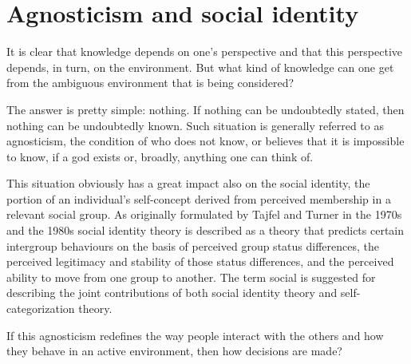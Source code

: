 \section{Agnosticism and social identity}
It is clear that knowledge depends on one’s perspective and that this perspective depends, in turn, on the environment. But what kind of knowledge can one get from the ambiguous environment that is being considered?

The answer is pretty simple: nothing. If nothing can be undoubtedly stated, then nothing can be undoubtedly known. Such situation is generally referred to as agnosticism, the condition of who does not know, or believes that it is impossible to know, if a god exists or, broadly, anything\cite{11} one can think of.

This situation obviously has a great impact also on the social identity, the portion of an individual's self-concept derived from perceived membership in a relevant social group. As originally formulated by Tajfel and Turner in the 1970s and the 1980s\cite{12} social identity theory is described as a theory that predicts certain intergroup behaviours on the basis of perceived group status differences, the perceived legitimacy and stability of those status differences, and the perceived ability to move from one group to another. The term social is suggested for describing the joint contributions of both social identity theory and self-categorization theory.

If this agnosticism redefines the way people interact with the others and how they behave in an active environment, then how decisions are made?
